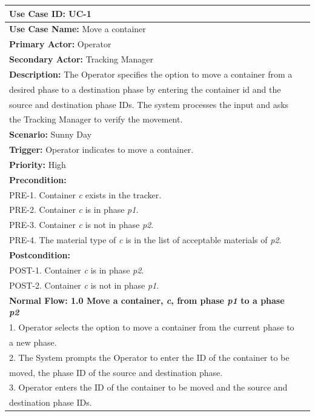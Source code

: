\begin{table}[h]
\begin{center}
\begin{tabular}{|l|l|}
\hline
\textbf{Use Case ID:} UC-1 \\ \hline
\textbf{Use Case Name:} Move a container \\ \hline
\textbf {Primary Actor:} Operator \\ \hline
\textbf {Secondary Actor:} Tracking Manager \\ \hline
\textbf{Description:} The Operator specifies the option to move a container from a \\desired phase to a destination phase by entering the container id and the \\source and destination phase IDs. The system processes the input and asks \\the Tracking Manager to verify the movement. \\ \hline
\textbf{Scenario:} Sunny Day \\ \hline
\textbf{Trigger:} Operator indicates to move a container.\\ \hline
\textbf{Priority:} High \\ \hline
\textbf{Precondition:}
\\ PRE-1. Container \emph{c} exists in the tracker.
\\ PRE-2. Container \emph{c} is in phase \emph{p1}.
\\ PRE-3. Container \emph{c} is not in phase \emph{p2}.
\\ PRE-4. The material type of \emph{c} is in the list of acceptable materials of \emph{p2}. \\ \hline
\textbf{Postcondition:}
\\ POST-1. Container \emph{c} is in phase \emph{p2}.
\\ POST-2. Container \emph{c} is not in phase \emph{p1}. \\ \hline
\textbf{Normal Flow: 1.0 Move a container, \emph{c}, from phase \emph{p1} to a phase \emph{p2}}
\\ 1. Operator selects the option to move a container from the current phase to \\a new phase.
\\ 2. The System prompts the Operator to enter the ID of the container to be \\moved, the phase ID of the source and destination phase.
\\ 3. Operator enters the ID of the container to be moved and the source and \\destination phase IDs.

\end{tabular}
\end{center}
\end{table}
